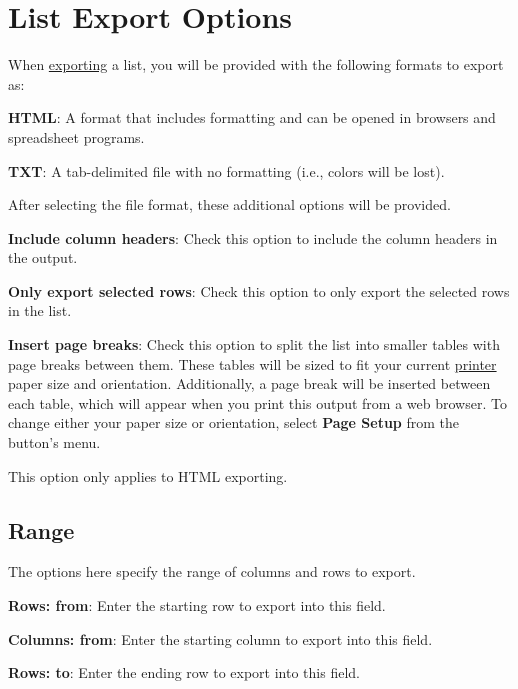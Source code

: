 \documentclass[
]{book}
\newenvironment{optionssection}
    {
    \begin{tcolorbox}[colframe=lightgray,colback=ultralightgray,sharp corners=all,parbox=false]
    }
    {
    \end{tcolorbox}
    }
\theoremstyle{definition}
\theoremstyle{definition}
\theoremstyle{definition}
\theoremstyle{definition}
\theoremstyle{remark}
\begin{document}
\hypertarget{export-list}{%
\section{List Export Options}\label{export-list}}

When \protect\hyperlink{exporting}{exporting} a list, you will be provided with the following formats to export as:

\begin{optionssection}
\textbf{HTML}: A format that includes formatting and can be opened in browsers and spreadsheet programs.

\textbf{TXT}: A tab-delimited file with no formatting (i.e., colors will be lost).

\end{optionssection}

After selecting the file format, these additional options will be provided.

\textbf{Include column headers}: Check this option to include the column headers in the output.

\textbf{Only export selected rows}: Check this option to only export the selected rows in the list.

\textbf{Insert page breaks}: Check this option to split the list into smaller tables with page breaks between them. These tables will be sized to fit your current \protect\hyperlink{printing}{printer} paper size and orientation. Additionally, a page break will be inserted between each table, which will appear when you print this output from a web browser. To change either your paper size or orientation, select \textbf{Page Setup} from the  button's menu.

This option only applies to HTML exporting.

\hypertarget{range}{%
\subsection*{Range}\label{range}}

The options here specify the range of columns and rows to export.

\textbf{Rows: from}: Enter the starting row to export into this field.

\textbf{Columns: from}: Enter the starting column to export into this field.

\textbf{Rows: to}: Enter the ending row to export into this field.
\end{document}
